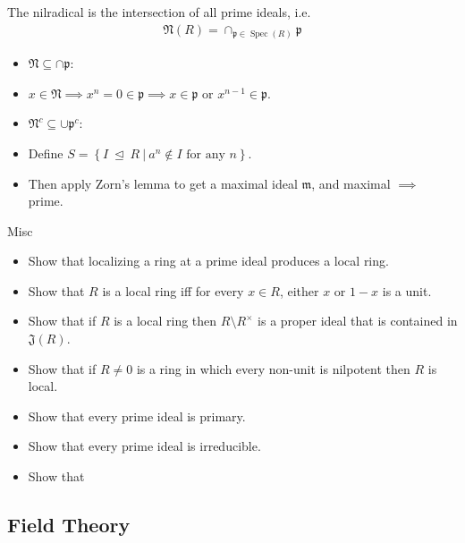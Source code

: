 \begin{problem}

The nilradical is the intersection of all prime ideals, i.e.
\begin{align*}
\mathfrak{N}(R) = \cap_{\mathfrak{p} \in \operatorname{Spec}(R)} \mathfrak{p}
\end{align*}

\end{problem}

\begin{solution}

\begin{itemize}
\item
  \(\mathfrak{N} \subseteq \cap\mathfrak{p}\):
\item
  \(x \in \mathfrak{N} \implies x^n = 0 \in \mathfrak p \implies x\in \mathfrak{p} \text{ or } x^{n-1}\in\mathfrak p\).
\item
  \(\mathfrak{N}^c \subseteq \cup\mathfrak{p}^c\):
\item
  Define
  \(S = \left\{{I{~\trianglelefteq~}R {~\mathrel{\Big|}~}a^n\not\in I \text{ for any } n}\right\}\).
\item
  Then apply Zorn's lemma to get a maximal ideal \({\mathfrak{m}}\), and
  maximal \(\implies\) prime.
\end{itemize}

\end{solution}

Misc

\begin{itemize}
\tightlist
\item
  Show that localizing a ring at a prime ideal produces a local ring.
\item
  Show that \(R\) is a local ring iff for every \(x\in R\), either \(x\)
  or \(1-x\) is a unit.
\item
  Show that if \(R\) is a local ring then \(R\setminus R^{\times}\) is a
  proper ideal that is contained in \({\mathfrak{J}}(R)\).
\item
  Show that if \(R\neq 0\) is a ring in which every non-unit is
  nilpotent then \(R\) is local.
\item
  Show that every prime ideal is primary.
\item
  Show that every prime ideal is irreducible.
\item
  Show that
\end{itemize}

\hypertarget{field-theory-1}{%
\subsection{Field Theory}\label{field-theory-1}}

